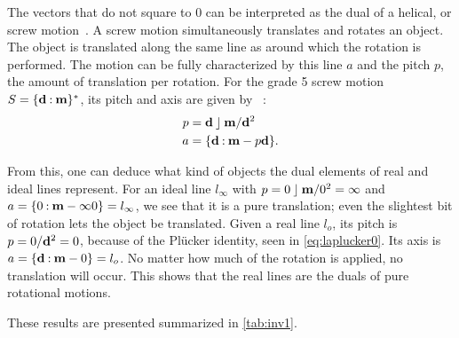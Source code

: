 The vectors that do not square to $0$ can be interpreted as the dual of a helical, or screw motion~\cite[Section 3.1.2]{Pottmann}.  A screw motion simultaneously translates and rotates an object.  The object is translated along the same line as around which the rotation is performed.  The motion can be fully characterized by this line $a$ and the pitch $p$, the amount of translation per rotation.  For the grade 5 screw motion $S = \{\mathbf{d} \mathbin{:} \mathbf{m}\}^\ast$, its pitch and axis are given by ~\cite[Theorem 3.1.9]{Pottmann}:
\begin{align}
  \label{eq:screwparams}
  p &= \mathbf{d} \mathbin{\rfloor} \mathbf{m} / \mathbf{d}^2 \nonumber \\
  a &= \{\mathbf{d} \mathbin{:} \mathbf{m} - p \mathbf{d}\} .
\end{align}

From this, one can deduce what kind of objects the dual elements of real and ideal lines represent.  For an ideal line $l_\infty$ with $p = 0 \mathbin{\rfloor} \mathbf{m} / 0^2 = \infty$ and $a = \{0 \mathbin{:} \mathbf{m} - \infty 0\} = l_\infty$, we see that it is a pure translation; even the slightest bit of rotation lets the object be translated.  Given a real line $l_o$, its pitch is $p = 0 / \mathbf{d}^2 = 0$, because of the Pl\"ucker identity, seen in \autoref{eq:laplucker0}.  Its axis is $a = \{\mathbf{d} \mathbin{:} \mathbf{m} - 0\} = l_o$.  No matter how much of the rotation is applied, no translation will occur.  This shows that the real lines are the duals of pure rotational motions.

These results are presented summarized in \autoref{tab:inv1}. 



